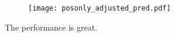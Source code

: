 \begin{answer}
	\begin{figure}[H]
		\centering
		\texttt{[image: posonly\_adjusted\_pred.pdf]}
	\end{figure}
	The performance is great.
\end{answer}
